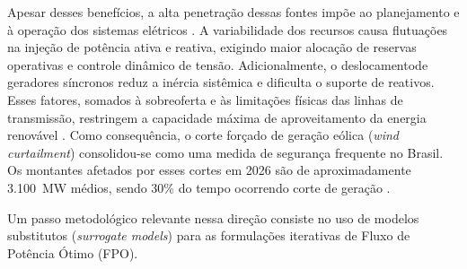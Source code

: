 \documentclass[conference]{IEEEtran}
\begin{document}
Apesar desses benefícios, a alta penetração dessas fontes impõe ao planejamento e à operação dos sistemas elétricos
\cite{barrera2025comprehensive}. A variabilidade dos recursos causa flutuações na injeção de potência ativa e reativa, exigindo maior alocação de reservas operativas e controle dinâmico de tensão. Adicionalmente, o deslocamentode geradores síncronos reduz a inércia sistêmica e dificulta o suporte de reativos. Esses fatores, somados à sobreoferta e às limitações físicas das linhas de transmissão, restringem a capacidade máxima de aproveitamento da energia renovável \cite{veras2026modeling}. Como consequência, o corte forçado de geração eólica (\textit{wind curtailment}) consolidou-se como uma medida de segurança frequente no Brasil. Os montantes afetados por esses cortes em 2026 são de aproximadamente 3.100~MW médios, sendo 30\% do tempo ocorrendo corte de geração \cite{ons_curtailment_2025}.



Um passo metodológico relevante nessa direção consiste no uso de modelos
substitutos (\textit{surrogate models}) para as formulações iterativas de
Fluxo de Potência Ótimo (FPO).
\end{document}
